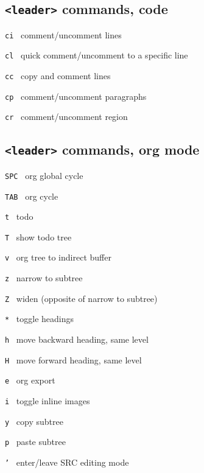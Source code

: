 \documentclass[fontsize=9pt,
                letterpaper,
                headings=normal,
                landscape]{scrartcl}
\newcommand{\cm}[2]{\noindent\raggedright\texttt{#1} \dotfill\ #2 \newline}
\begin{document}
\begin{multicols*}{3}
\subsection*{\texttt{<leader>} commands, code}

\cm{ci}{comment/uncomment lines}
\cm{cl}{quick comment/uncomment to a specific line}
\cm{cc}{copy and comment lines}
\cm{cp}{comment/uncomment paragraphs}
\cm{cr}{comment/uncomment region}



\subsection*{\texttt{<leader>} commands, org mode}

\cm{SPC}{org global cycle}
\cm{TAB}{org cycle}
\cm{t}{todo}
\cm{T}{show todo tree}
\cm{v}{org tree to indirect buffer}
\cm{z}{narrow to subtree}
\cm{Z}{widen (opposite of narrow to subtree)}
\cm{*}{toggle headings}
\cm{h}{move backward heading, same level}
\cm{H}{move forward heading, same level}
\cm{e}{org export}
\cm{i}{toggle inline images}
\cm{y}{copy subtree}
\cm{p}{paste subtree}
\cm{'}{enter/leave SRC editing mode}



\end{multicols*}
\end{document}
